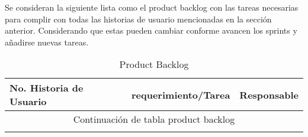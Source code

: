 Se consideran la siguiente lista como el product backlog con las tareas necesarias para complir con todas las historias de usuario mencionadas en la sección anterior.
Considerando que estas pueden cambiar conforme avancen los sprints y añadirse nuevas tareas.

\begin{longtable}{ p{2cm} | p{10cm} | p{2cm} }

	\hline
	No. Historia de Usuario & requerimiento/Tarea &  Responsable \\[0.5cm]
	\hline
	\hline

	\endfirsthead

	\multicolumn{3}{c}{Continuación de tabla product backlog }\\
	\hline
	\hline
	\endhead

	\hline
	\hline
	\caption{Product Backlog}
	\endlastfoot



\end{longtable}
